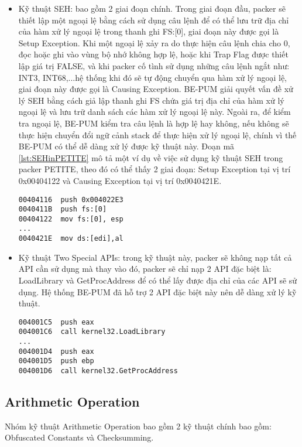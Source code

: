 \begin{itemize}
\item{Kỹ thuật SEH: bao gồm 2 giai đoạn chính. Trong giai đoạn đầu, packer sẽ thiết lập một ngoại lệ bằng cách sử dụng câu lệnh để có thể lưu trữ địa chỉ của hàm xử lý ngoại lệ trong thanh ghi FS:[0], giai đoạn này được gọi là Setup Exception. Khi một ngoại lệ xảy ra do thực hiện câu lệnh chia cho 0, đọc hoặc ghi vào vùng bộ nhớ không hợp lệ, hoặc khi Trap Flag được thiết lập giá trị FALSE, và khi packer cố tình sử dụng những câu lệnh ngắt như: INT3, INT68,...hệ thống khi đó sẽ tự động chuyển qua hàm xử lý ngoại lệ, giai đoạn này được gọi là Causing Exception. BE-PUM giải quyết vấn đề xử lý SEH bằng cách giả lập thanh ghi FS chứa giá trị địa chỉ của hàm xử lý ngoại lệ và lưu trữ danh sách các hàm xử lý ngoại lệ này. Ngoài ra, để kiểm tra ngoại lệ, BE-PUM kiểm tra câu lệnh là hợp lệ hay không, nếu không sẽ thực hiện chuyển đổi ngữ cảnh stack để thực hiện xử lý ngoại lệ, chính vì thế BE-PUM có thể dễ dàng xử lý được kỹ thuật này. Đoạn mã \ref {lst:SEHinPETITE} mô tả một ví dụ về việc sử dụng kỹ thuật SEH trong packer PETITE, theo đó có thể thấy 2 giai đoạn: Setup Exception tại vị trí 0x00404122 và Causing Exception tại vị trí 0x0040421E.
\begin{code}
\begin{lstlisting}[captionpos=b,caption={Kỹ thuật SEH sử dụng trong packer PETITE},label={lst:SEHinPETITE},frame=single]
00404116  push 0x004022E3
0040411B  push fs:[0]
00404122  mov fs:[0], esp
...
0040421E  mov ds:[edi],al
\end{lstlisting}
\end{code}
}
\item{Kỹ thuật Two Special APIs: trong kỹ thuật này, packer sẽ không nạp tất cả API cần sử dụng mà thay vào đó, packer sẽ chỉ nạp 2 API đặc biệt là: LoadLibrary và GetProcAddress để có thể lấy được địa chỉ của các API sẽ sử dụng. Hệ thống BE-PUM đã hỗ trợ 2 API đặc biệt này nên dễ dàng xử lý kỹ thuật.
\begin{code}
\begin{lstlisting}[captionpos=b,caption={Kỹ thuật Two Special APIs sử dụng trong packer FSG},label={lst:TwoAPIinFSG},frame=single]
004001C5  push eax
004001C6  call kernel32.LoadLibrary
...
004001D4  push eax
004001D5  push ebp
004001D6  call kernel32.GetProcAddress
\end{lstlisting}
\end{code}
}
\end{itemize}

\subsection{Arithmetic Operation}\label{subsec:Packer5Tech}
\hspace{0.5cm}Nhóm kỹ thuật Arithmetic Operation bao gồm 2 kỹ thuật chính bao gồm: Obfuscated Constants và Checksumming.

